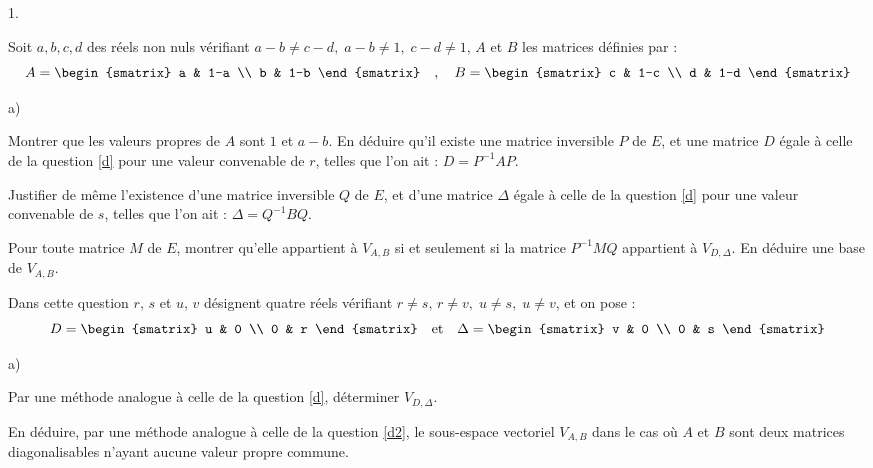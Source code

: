 \documentclass[11pt]{article}%
\begin{document}
\begin{noliste}{1.}
\item \label{d2} Soit $a,b,c,d$ des réels non nuls vérifiant $a-b\neq
c-d,\;a-b\neq 1,\;c-d\neq 1$, $A$ et $B$ les matrices définies
par : \quad 
\[
A = 
\begin{smatrix}
a & 1-a \\
b & 1-b
\end{smatrix}
\quad,\quad B = 
\begin{smatrix}
c & 1-c \\
d & 1-d
\end{smatrix}
\]

\begin{noliste}{a)}
 \setlength{\itemsep}{2mm}
\item Montrer que les valeurs propres de $A$ sont $1$ et $a-b$. En
déduire
qu'il existe une matrice inversible $P$ de $E$, et une matrice $D$
égale
à celle de la question \ref{d} pour une valeur convenable de $r$,
telles
que l'on ait : $D = P^{-1} A P$.

\item Justifier de même l'existence d'une matrice inversible $Q$ de
$E$,
et d'une matrice $\Delta$ égale à celle de la question \ref{d} pour une
valeur convenable de $s$, telles que l'on ait : $\Delta = Q^{-1} B Q$.

\item Pour toute matrice $M$ de $E$, montrer qu'elle appartient à
$V_{A,B}$
si et seulement si la matrice $P^{-1}M Q$ appartient à $V_{D,\Delta}$.
En
déduire une base de $V_{A,B}$.
\end{noliste}

\item Dans cette question $r,\,s$ et $u,\,v$ désignent quatre réels
vérifiant $r\neq s,\,r\neq v,\;u\neq s,\;u\neq v$, et on pose : 
\[
D = 
\begin{smatrix}
u & 0 \\
0 & r
\end{smatrix}
\quad \text{et}\quad \Delta = 
\begin{smatrix}
v & 0 \\
0 & s
\end{smatrix}
\]

\begin{noliste}{a)}
 \setlength{\itemsep}{2mm}
\item \vspace{-2mm} Par une méthode analogue à celle de la question
\ref{d}, déterminer $V_{D,\Delta}$.

\item En déduire, par une méthode analogue à celle de la question
\ref{d2}, le sous-espace vectoriel $V_{A,B}$ dans le cas où $A$ et $B$
sont
deux matrices diagonalisables n'ayant aucune valeur propre commune.
\end{noliste}
\end{noliste}
\end{document}
